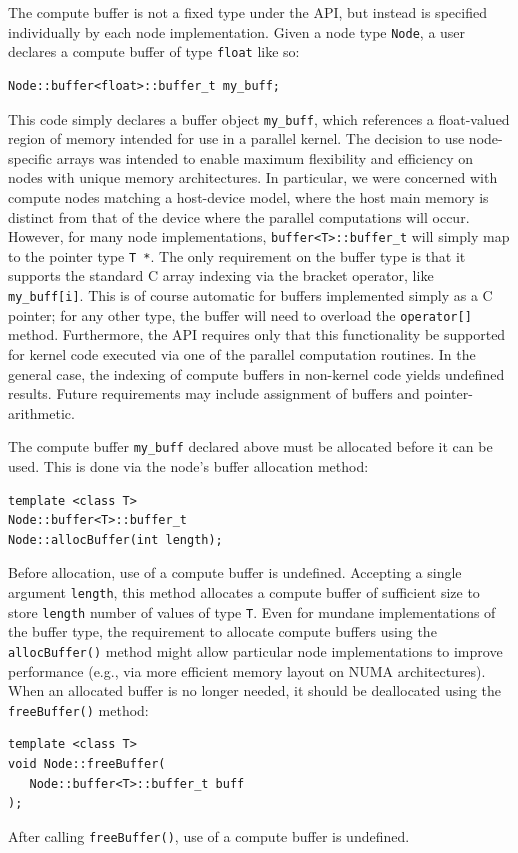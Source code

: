 \documentclass[10pt,conference,letterpaper]{IEEEtran}
\begin{document}
The compute buffer is not a fixed type under the API, but instead is specified individually by each node implementation. Given a node type \texttt{Node}, a user declares a compute buffer of type \verb!float! like so:
{\small \begin{verbatim}
Node::buffer<float>::buffer_t my_buff;
\end{verbatim}}
This code simply declares a buffer object \verb!my_buff!, which references a float-valued region of memory intended for use in a parallel kernel. The decision to use node-specific arrays was intended to enable maximum flexibility and efficiency on nodes with unique memory architectures. In particular, we were concerned with compute nodes matching a host-device model, where the host main memory is distinct from that of the device where the parallel computations will occur. However, for many node implementations, \verb!buffer<T>::buffer_t! will simply map to the pointer type \verb!T *!. The only requirement on the buffer type is that it supports the standard C array indexing via the bracket operator, like \verb!my_buff[i]!. This is of course automatic for buffers implemented simply as a C pointer; for any other type, the buffer will need to overload the \verb!operator[]! method. Furthermore, the API requires only that this functionality be supported for kernel code executed via one of the parallel computation routines. In the general case, the indexing of compute buffers in non-kernel code yields undefined results. Future requirements may include assignment of buffers and pointer-arithmetic. 

The compute buffer \verb!my_buff! declared above must be allocated before it can be used. This is done via the node's buffer allocation method:
{\small \begin{verbatim}
template <class T>
Node::buffer<T>::buffer_t
Node::allocBuffer(int length); 
\end{verbatim}}
\noindent Before allocation, use of a compute buffer is undefined. Accepting a single argument \verb!length!, this method allocates a compute buffer of sufficient size to store \verb!length! number of values of type \verb!T!. Even for mundane implementations of the buffer type, the requirement to allocate compute buffers using the \verb!allocBuffer()! method might allow particular node implementations to improve performance (e.g., via more efficient memory layout on NUMA architectures). When an allocated buffer is no longer needed, it should be deallocated using the \verb!freeBuffer()! method:
{\small \begin{verbatim}
template <class T>
void Node::freeBuffer(
   Node::buffer<T>::buffer_t buff
);
\end{verbatim}}
\noindent After calling \verb!freeBuffer()!, use of a compute buffer is undefined.
\end{document}
